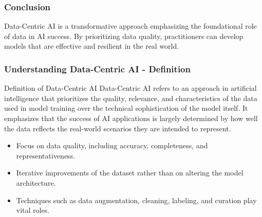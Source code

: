 \documentclass[aspectratio=169]{beamer}
\begin{document}
\begin{frame}[fragile]
    \frametitle{Conclusion}
    Data-Centric AI is a transformative approach emphasizing the foundational role of data in AI success. By prioritizing data quality, practitioners can develop models that are effective and resilient in the real world.
\end{frame}

\begin{frame}[fragile]
    \frametitle{Understanding Data-Centric AI - Definition}
    \begin{block}{Definition of Data-Centric AI}
        Data-Centric AI refers to an approach in artificial intelligence that prioritizes the quality, relevance, and characteristics of the data used in model training over the technical sophistication of the model itself. 
        It emphasizes that the success of AI applications is largely determined by how well the data reflects the real-world scenarios they are intended to represent.
    \end{block}

    \begin{itemize}
        \item Focus on data quality, including accuracy, completeness, and representativeness.
        \item Iterative improvements of the dataset rather than on altering the model architecture.
        \item Techniques such as data augmentation, cleaning, labeling, and curation play vital roles.
    \end{itemize}
\end{frame}
\end{document}
